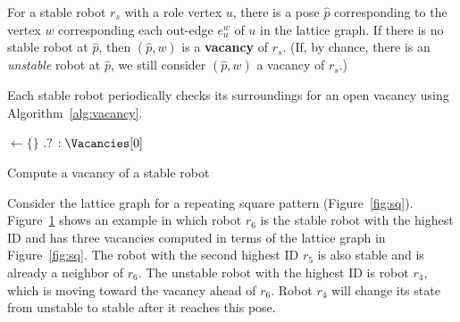 \begin{defn}
  For a stable robot $r_s$ with a role vertex $u$,
  there is a pose $\hat{p}$ corresponding to the vertex $w$
  corresponding each out-edge $e_{u}^w$ of $u$ in the lattice graph. 
  If there is no stable robot
  at $\hat{p}$, then $(\hat{p}, w)$ is a \textbf{vacancy} of $r_s$.
  (If, by chance, there is an \emph{unstable} robot at $\hat{p}$,
  we still consider $(\hat{p}, w)$ a vacancy of $r_s$.)
\end{defn}


Each stable robot periodically checks its surroundings for an open vacancy 
using Algorithm~\ref{alg:vacancy}. 

\begin{algorithm}
{}
\Input{\InMsgs, \Obsv}
\Output{\MyV}
  \Vacancies $\leftarrow \{\}$\; 
  \Return \Vacancies.\Empty $?$ \Null $: \Vacancies[0]$\;
  \caption{Compute a vacancy of a stable robot}
  \label{alg:vacancy}
\end{algorithm}


Consider the lattice graph for a repeating square pattern (Figure~\ref{fig:sq}).
Figure~\ref{fig:vacancy} shows an example in which robot $r_6$
is the stable robot with the highest ID and has three vacancies computed in terms of the
lattice graph in Figure~\ref{fig:sq}. 
%
The robot with the second highest ID $r_5$ is also stable and is already a neighbor of $r_6$.
%
The unstable robot with the highest ID is robot $r_4$, which is moving toward the vacancy ahead of $r_6$.  
%
Robot $r_4$
will change its state from unstable to stable after it reaches this pose.

\begin{figure}
  \centering
  
  \label{fig:vacancy}
\end{figure}


